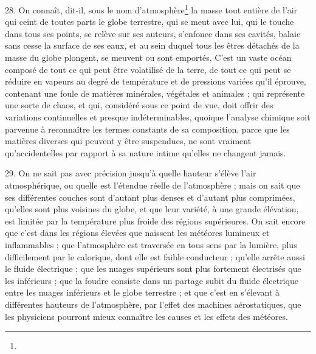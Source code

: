 \documentclass[a4paper, 11pt, oneside, polutonikogreek, french]{article}
\begin{document}
28. \og On connaît, dit-il, sous le nom d'atmosphère\footnote{} la masse tout entière de l'air qui ceint de toutes parts le globe terrestre, qui se meut avec lui, qui le touche dans tous ses points, se relève sur ses auteurs, s'enfonce dans ses cavités, balaie sans cesse la surface de ses eaux, et au sein duquel tous les êtres détachés de la masse du globe plongent, se meuvent ou sont emportés. C'est un vaste océan composé de tout ce qui peut être volatilisé de la terre, de tout ce qui peut se réduire en vapeurs au degré de température et de pressions variées qu'il éprouve, contenant une foule de matières minérales, végétales et animales ; qui représente une sorte de chaos, et qui, considéré sous ce point de vue, doit offrir des variations continuelles et presque indéterminables, quoique l'analyse chimique soit parvenue à reconnaître les termes constants de sa composition, parce que les matières diverses qui peuvent y être suspendues, ne sont vraiment qu'accidentelles par rapport à sa nature intime qu'elles ne changent jamais. \fg

29. \og On ne sait pas avec précision jusqu'à quelle hauteur s'élève l'air atmosphérique, ou quelle est l'étendue réelle de l'atmosphère ; mais on sait que ses différentes couches sont d'autant plus denses et d'autant plus comprimées, qu'elles sont plus voisines du globe, et que leur variété, à une grande élévation, est limitée par la température plus froide des régions supérieures. On sait encore que c'est dans les régions élevées que naissent les météores lumineux et inflammables ; que l'atmosphère est traversée en tous sens par la lumière, plus difficilement par le calorique, dont elle est faible conducteur ; qu'elle arrête aussi le fluide électrique ; que les nuages supérieurs sont plus fortement électrisés que les inférieurs ; que la foudre consiste dans un partage subit du fluide électrique entre les nuages inférieurs et le globe terrestre ; et que c'est en s'élevant à différentes hauteurs de l'atmosphère, par l'effet des machines aérostatiques, que les physiciens pourront mieux connaître les causes et les effets des météores. \fg
\end{document}
